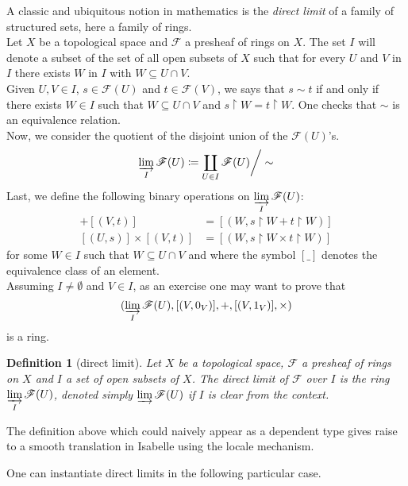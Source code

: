 \documentclass[12pt]{scrartcl}
\newtheorem{definition}[proposition]{Definition}
\begin{document}

A classic and ubiquitous notion in mathematics is the \emph{direct limit} of a family of structured sets, here a family of rings. \\
Let $X$ be a topological space and $\mathscr{F}$ a presheaf of rings on $X$. The set $I$ will denote a subset of the set of all open subsets of $X$ such that for every $U$ and $V$ in $I$ there exists $W$ in $I$ with $W \subseteq U \cap V$. \\
Given $U, V \in I$, $s \in \mathscr{F}(U)$ and $t \in \mathscr{F}(V)$,  we says that 
$s \sim t$ if and only if there exists $W \in I$ such that $W \subseteq U \cap V$ and $s \restriction W = t \restriction W$. One checks that $\sim$ is an equivalence relation. \\
Now, we consider the quotient of the disjoint union of the $\mathscr{F}(U)$'s.
	\[
	\varinjlim_I \mathscr{F}(U) \coloneqq \coprod_{U \in I} \mathscr{F}(U) \bigg/ \sim 
	\]
Last, we define the following binary operations on $\displaystyle \varinjlim_{I} \mathscr{F}(U)$:
	\begin{align*}
	[(U, s)] + [(V, t)] & = [(W, s \restriction W + t \restriction W)] \\
	[(U, s)] \times [(V, t)] & = [(W, s \restriction W \times t \restriction W)]
	\end{align*}
for some $W \in I$ such that $W \subseteq U \cap V$ and where the symbol $[\_]$ denotes the equivalence class of an element. \\
Assuming $I \neq \emptyset$ and $V \in I$, as an exercise one may want to prove that  
	\[
	(\varinjlim_I \mathscr{F}(U), [(V, 0_V)], +, [(V, 1_V)], \times)
	\]
is a ring. 

\begin{definition}[direct limit]
	Let $X$ be a topological space, $\mathscr{F}$ a presheaf of rings on $X$ and $I$ a set of open subsets of $X$. The direct limit of $\mathscr{F}$ over $I$ is the ring $\displaystyle \varinjlim_I \mathscr{F}(U)$, denoted simply $\varinjlim \mathscr{F}(U)$ if $I$ is clear from the context.
\end{definition}

The definition above which could naively appear as a dependent type gives raise to a smooth translation in Isabelle using the locale mechanism.


One can instantiate direct limits in the following particular case.
\end{document}
